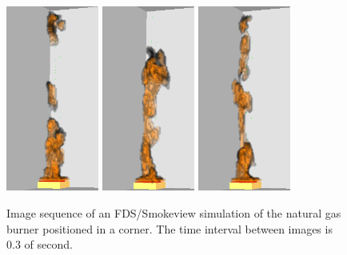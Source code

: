 \documentclass[twoside]{uocthesis}
\begin{document}
\begin{figure}[p]
	\includegraphics[width=1.2in]{../Figures/FDSNG_Corner7}
	\includegraphics[width=1.2in]{../Figures/FDSNG_Corner8}
	\includegraphics[width=1.2in]{../Figures/FDSNG_Corner9} \\
	

	\caption[Image sequence of an FDS/Smokeview simulation of the natural gas burner positioned in a corner.]{Image sequence of an FDS/Smokeview simulation of the natural gas burner positioned in a corner. The time interval between images is 0.3 of second.}
	\label{GBNG34Sequence}
\end{figure}
\end{document}
